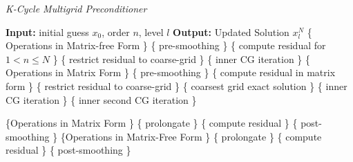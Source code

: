 \documentclass[11pt,a4paper,twoside]{article}
\begin{document}
	\begin{algorithm}[]
		\caption{\emph{K-Cycle Multigrid  Preconditioner}}
		\label{Alg:K_cycle}
		\begin{algorithmic}[1]
			\State \textbf{Input:} initial guess $ x_0 $, order $ n $, level $ l $ 
			\State \textbf{Output:} Updated Solution $x_l^N$
			 \hfill \{ Operations in Matrix-free Form \}
			\hfill \{ pre-smoothing \}
			\hfill \{ compute residual  for $ 1<n\leq N $  \}
			\hfill \{ restrict residual to coarse-grid  \}
			\hfill \{ inner CG iteration \}	
			\Else  \hfill \hfill \{ Operations in Matrix Form \}
			\hfill \{ pre-smoothing \}
			\hfill \{ compute residual in matrix form  \}
			\hfill \{ restrict residual to coarse-grid  \}
			\hfill \{ coarsest grid exact solution \}
			\Else
			\hfill \{ inner CG iteration \}
			\Else
			\hfill \{ inner second CG iteration \}
			
			
			
			\EndIf
			
			\EndIf
			
			\hfill \{Operations in Matrix Form  \}
			\hfill \{ prolongate \}	
			\hfill \{ compute residual \}	
			\hfill \{ post-smoothing \}	
			\Else \hfill \{Operations in Matrix-Free Form  \}
			\hfill \{ prolongate \}	
			\hfill \{ compute residual \}	
			\hfill \{ post-smoothing \}
			\EndIf
			\EndIf
		\end{algorithmic}
	\end{algorithm}
	
\end{document}
